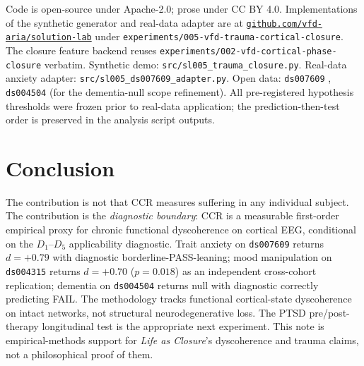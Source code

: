 \documentclass[11pt,a4paper]{article}
\begin{document}
Code is open-source under Apache-2.0; prose under CC BY 4.0. Implementations of the synthetic generator and real-data adapter are at \href{https://github.com/vfd-aria/solution-lab}{\texttt{github.com/vfd-aria/solution-lab}} under \texttt{experiments/005-vfd-trauma-cortical-closure}. The closure feature backend reuses \texttt{experiments/002-vfd-cortical-phase-closure} verbatim. Synthetic demo: \texttt{src/sl005\_trauma\_closure.py}. Real-data anxiety adapter: \texttt{src/sl005\_ds007609\_adapter.py}. Open data: \texttt{ds007609} \citep{ShalamberidzeAnxiety2025}, \texttt{ds004504} \citep{MiltiadousDementia2023} (for the dementia-null scope refinement). All pre-registered hypothesis thresholds were frozen prior to real-data application; the prediction-then-test order is preserved in the analysis script outputs.

\section{Conclusion}\label{sec:conclusion}

The contribution is not that CCR measures suffering in any individual subject. The contribution is the \emph{diagnostic boundary}: CCR is a measurable first-order empirical proxy for chronic functional dyscoherence on cortical EEG, conditional on the $D_1$--$D_5$ applicability diagnostic. Trait anxiety on \texttt{ds007609} returns $d = +0.79$ with diagnostic borderline-PASS-leaning; mood manipulation on \texttt{ds004315} returns $d = +0.70$ ($p = 0.018$) as an independent cross-cohort replication; dementia on \texttt{ds004504} returns null with diagnostic correctly predicting FAIL. The methodology tracks functional cortical-state dyscoherence on intact networks, not structural neurodegenerative loss. The PTSD pre/post-therapy longitudinal test is the appropriate next experiment. This note is empirical-methods support for \emph{Life as Closure}'s dyscoherence and trauma claims, not a philosophical proof of them.



\end{document}
